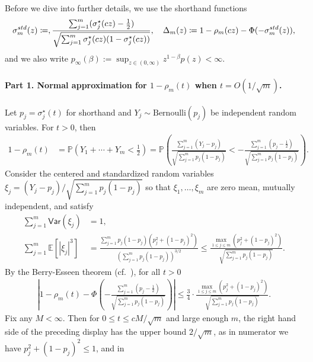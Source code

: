 \documentclass[11pt]{article}
\newcommand{\var}{\mathsf{Var}}
\newcommand{\Ep}{\mathbb{E}}
\newcommand{\Prb}{\mathbb{P}}
\newcommand{\prn}[1]{\left({#1}\right)} %
\newcommand{\prns}[1]{({#1})} %
\newcommand{\brk}[1]{\left[{#1}\right]} %
\newcommand{\<}{\langle} %
\renewcommand{\>}{\rangle}
\newcommand{\defeq}{\coloneqq}
\newcommand{\half}{\frac{1}{2}}
\newcommand{\opt}{^\star}
\begin{document}
\newcommand{\linkstd}{\sigma_m^{\textup{std}}}

Before we dive into further details, we use the shorthand functions
\begin{equation}
  \linkstd(z)
  \defeq, \frac{\sum_{j=1}^m \prns{\sigma_j\opt(cz) - \half}}{\sqrt{\sum_{j=1}^m \sigma_j\opt(cz)\prns{1 - \sigma_j\opt(cz)}}},
  ~~~
  \Delta_m(z) \defeq 1 - \rho_m(cz) - \Phi(- \linkstd(z))
  \label{eqn:std-link},
\end{equation}
and we also write $p_\infty(\beta) := \sup_{z \in (0, \infty)} z^{1-\beta}
p(z) < \infty$.

\paragraph{Part 1. Normal approximation for $1- \rho_m(t)$ when $t = O(1/\sqrt{m})$.} Let $p_j = \sigma_j\opt(t)$ for shorthand and $Y_j \sim \mathrm{Bernoulli}(p_j)$ be independent random variables. For $t > 0$, then
\begin{align*}
  1 - \rho_m(t) & = \Prb \prn{Y_1 + \cdots + Y_m < \half} = \Prb
  \prn{\frac{\sum_{j=1}^m (Y_j - p_j)}{\sqrt{\sum_{j=1}^m p_j
        (1-p_j)}} < - \frac{\sum_{j=1}^m (p_j - \half)}{
      \sqrt{\sum_{j=1}^m p_j (1-p_j)}}} .
\end{align*}
Consider the centered and standardized random variables $\xi_j = (Y_j - p_j)/\sqrt{\sum_{j=1}^m p_j (1-p_j)} $ so that $\xi_1, \dots, \xi_m$ are zero mean, mutually independent, and satisfy
\begin{align*}
  \sum_{j=1}^m \var \prn{\xi_j} & = 1  , \\
  \sum_{j=1}^m \Ep \brk{\left|\xi_j\right|^3} & =
  \frac{\sum_{j=1}^m p_j (1-p_j)(p_j^2 + (1-p_j)^2)}{\prns{\sum_{j=1}^m p_j (1-p_j)}^{3/2}}
  \leq \frac{\max_{1 \leq j \leq m} (p_j^2 + (1-p_j)^2)}{\sqrt{\sum_{j=1}^m p_j(1-p_j)}}  .
\end{align*} 
By the Berry-Esseen theorem (cf.~\citet{ChenGoSh10, Shevtsova14}), for all
$t > 0$
\begin{align*}
	\left|1 - \rho_m(t) - \Phi \left(-\frac{ \sum_{j=1}^m \left( p_j - \half\right)}{\sqrt{\sum_{j=1}^m p_j (1-p_j)}}\right)\right| \leq \frac{3}{4} \cdot \frac{\max_{1 \leq j \leq m} (p_j^2 + (1-p_j)^2)}{\sqrt{\sum_{j=1}^m p_j (1-p_j)}}  .
\end{align*}
%
Fix any $M <\infty$. Then for $0 \leq t \leq cM /\sqrt m$ and large enough
$m$, the right hand side of the preceding display has the upper bound
$2/\sqrt{m}$, as in numerator we have $p_j^2 + (1-p_j)^2 \leq 1$, and in
\end{document}
